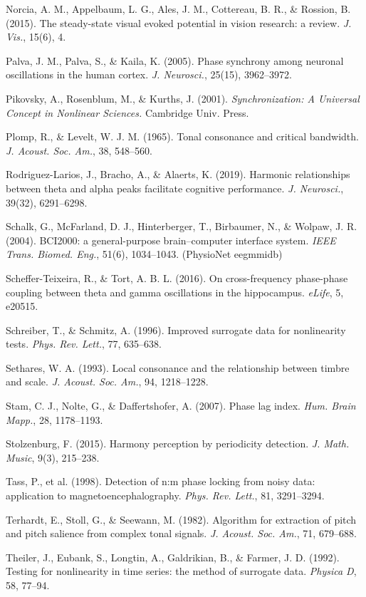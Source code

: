 \documentclass[11pt]{article}
\begin{document}
\begin{list}{}{\setlength{\itemsep}{1pt}\setlength{\leftmargin}{1.2em}\setlength{\itemindent}{-1.2em}}
\item Norcia, A. M., Appelbaum, L. G., Ales, J. M., Cottereau, B. R., \& Rossion, B. (2015). The steady-state visual evoked potential in vision research: a review. \emph{J. Vis.}, 15(6), 4.
\item Palva, J. M., Palva, S., \& Kaila, K. (2005). Phase synchrony among neuronal oscillations in the human cortex. \emph{J. Neurosci.}, 25(15), 3962–3972.
\item Pikovsky, A., Rosenblum, M., \& Kurths, J. (2001). \emph{Synchronization: A Universal Concept in Nonlinear Sciences.} Cambridge Univ. Press.
\item Plomp, R., \& Levelt, W. J. M. (1965). Tonal consonance and critical bandwidth. \emph{J. Acoust. Soc. Am.}, 38, 548–560.
\item Rodriguez-Larios, J., Bracho, A., \& Alaerts, K. (2019). Harmonic relationships between theta and alpha peaks facilitate cognitive performance. \emph{J. Neurosci.}, 39(32), 6291–6298.
\item Schalk, G., McFarland, D. J., Hinterberger, T., Birbaumer, N., \& Wolpaw, J. R. (2004). BCI2000: a general-purpose brain–computer interface system. \emph{IEEE Trans. Biomed. Eng.}, 51(6), 1034–1043. (PhysioNet eegmmidb)
\item Scheffer-Teixeira, R., \& Tort, A. B. L. (2016). On cross-frequency phase-phase coupling between theta and gamma oscillations in the hippocampus. \emph{eLife}, 5, e20515.
\item Schreiber, T., \& Schmitz, A. (1996). Improved surrogate data for nonlinearity tests. \emph{Phys. Rev. Lett.}, 77, 635–638.
\item Sethares, W. A. (1993). Local consonance and the relationship between timbre and scale. \emph{J. Acoust. Soc. Am.}, 94, 1218–1228.
\item Stam, C. J., Nolte, G., \& Daffertshofer, A. (2007). Phase lag index. \emph{Hum. Brain Mapp.}, 28, 1178–1193.
\item Stolzenburg, F. (2015). Harmony perception by periodicity detection. \emph{J. Math. Music}, 9(3), 215–238.
\item Tass, P., et al. (1998). Detection of n:m phase locking from noisy data: application to magnetoencephalography. \emph{Phys. Rev. Lett.}, 81, 3291–3294.
\item Terhardt, E., Stoll, G., \& Seewann, M. (1982). Algorithm for extraction of pitch and pitch salience from complex tonal signals. \emph{J. Acoust. Soc. Am.}, 71, 679–688.
\item Theiler, J., Eubank, S., Longtin, A., Galdrikian, B., \& Farmer, J. D. (1992). Testing for nonlinearity in time series: the method of surrogate data. \emph{Physica D}, 58, 77–94.

\end{list}
\end{document}
